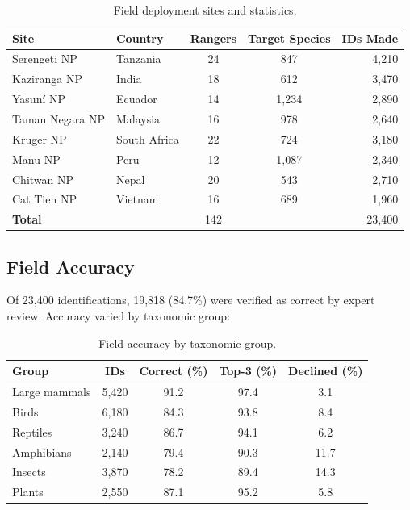 \documentclass[11pt,a4paper]{article}
\begin{document}
\begin{table}[H]
\centering
\caption{Field deployment sites and statistics.}
\label{tab:deployment}
\begin{tabularx}{\textwidth}{@{}llccr@{}}
\toprule
\textbf{Site} & \textbf{Country} & \textbf{Rangers} & \textbf{Target Species} & \textbf{IDs Made} \\
\midrule
Serengeti NP & Tanzania & 24 & 847 & 4,210 \\
Kaziranga NP & India & 18 & 612 & 3,470 \\
Yasun\'{i} NP & Ecuador & 14 & 1,234 & 2,890 \\
Taman Negara NP & Malaysia & 16 & 978 & 2,640 \\
Kruger NP & South Africa & 22 & 724 & 3,180 \\
Manu NP & Peru & 12 & 1,087 & 2,340 \\
Chitwan NP & Nepal & 20 & 543 & 2,710 \\
Cat Tien NP & Vietnam & 16 & 689 & 1,960 \\
\midrule
\textbf{Total} & & 142 & & 23,400 \\
\bottomrule
\end{tabularx}
\end{table}

\subsection{Field Accuracy}

Of 23,400 identifications, 19,818 (84.7\%) were verified as correct by expert review.
Accuracy varied by taxonomic group:

\begin{table}[H]
\centering
\caption{Field accuracy by taxonomic group.}
\label{tab:field_accuracy}
\begin{tabular}{@{}lcccc@{}}
\toprule
\textbf{Group} & \textbf{IDs} & \textbf{Correct (\%)} & \textbf{Top-3 (\%)} & \textbf{Declined (\%)} \\
\midrule
Large mammals & 5,420 & 91.2 & 97.4 & 3.1 \\
Birds & 6,180 & 84.3 & 93.8 & 8.4 \\
Reptiles & 3,240 & 86.7 & 94.1 & 6.2 \\
Amphibians & 2,140 & 79.4 & 90.3 & 11.7 \\
Insects & 3,870 & 78.2 & 89.4 & 14.3 \\
Plants & 2,550 & 87.1 & 95.2 & 5.8 \\
\bottomrule
\end{tabular}
\end{table}
\end{document}
